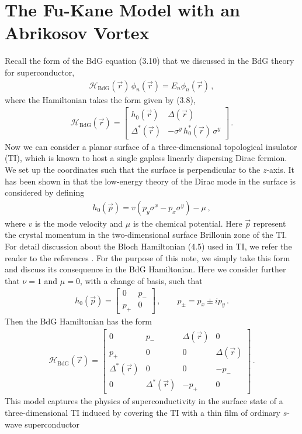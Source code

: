 \documentclass[11pt, oneside]{book}
\theoremstyle{break}
\theoremstyle{break}
\newcommand{\bmat}[1]{\begin{bmatrix} #1 \end{bmatrix}}
\begin{document}
\section{The Fu-Kane Model with an Abrikosov Vortex}
Recall the form of the BdG equation (3.10) that we discussed in the BdG theory for superconductor,
\begin{align}
\mathcal{H}_{\text{BdG}}(\vec{r})\, \phi_n(\vec{r}) = E_n \phi_n(\vec{r})\,,
\end{align}
where the Hamiltonian takes the form given by (3.8),
\begin{align}
\mathcal{H}_{\text{BdG}}(\vec{r}) = \bmat{h_0(\vec{r}) & \Delta(\vec{r}) \\ \Delta^*(\vec{r}) & -\sigma^y \,h_0^*(\vec{r})\, \sigma^y}\,.
\end{align}
Now we can consider a planar surface of a three-dimensional topological insulator (TI), which is known to host a single gapless linearly dispersing Dirac fermion. We set up the coordinates such that the surface is perpendicular to the $z$-axis. It has been shown in \cite{HasanKane} that the low-energy theory of the Dirac mode in the surface is considered by defining
\begin{align}
h_0(\vec{p}) = v(p_y \sigma^x - p_x \sigma^y) - \mu\,,
\end{align}
where $v$ is the mode velocity and $\mu$ is the chemical potential. Here $\vec{p}$ represent the crystal momentum in the two-dimensional surface Brillouin zone of the TI. For detail discussion about the Bloch Hamiltonian (4.5) used in TI, we refer the reader to the references \cite{Review, FuKane, HasanKane}. For the purpose of this note, we simply take this form and discuss its consequence in the BdG Hamiltonian. Here we consider further that $\nu = 1$ and $\mu = 0$, with a change of basis, such that
\begin{align}
h_0(\vec{p}) = \bmat{0 & p_- \\ p_+ & 0}\,,\qquad
p_{\pm} = p_x \pm ip_y\,.
\end{align}
Then the BdG Hamiltonian has the form
\begin{align}
\mathcal{H}_{\text{BdG}}(\vec{r}) = \bmat{
0 & p_- & \Delta(\vec{r}) & 0 \\
p_+ & 0 & 0 & \Delta(\vec{r})\\
\Delta^*(\vec{r}) & 0 & 0 & -p_-\\
0 & \Delta^*(\vec{r}) & -p_+ & 0}\,.
\end{align}
This model captures the physics of superconductivity in the surface state of a three-dimensional TI induced by covering the TI with a thin film of ordinary $s$-wave superconductor
\end{document}
